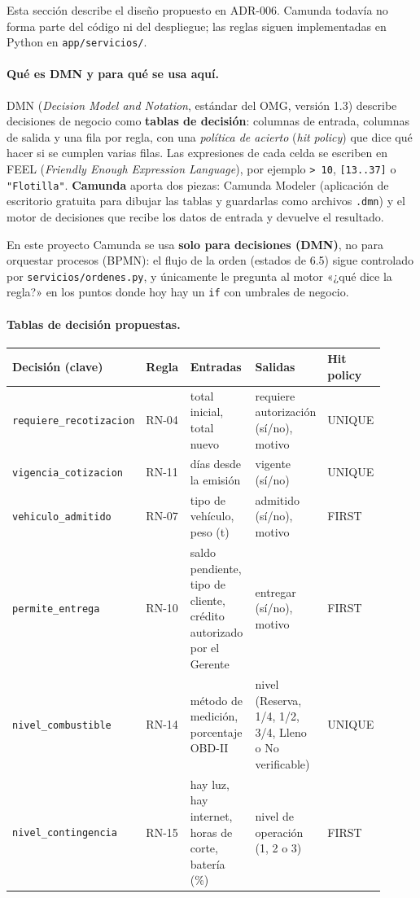 Esta sección describe el diseño propuesto en ADR-006. Camunda todavía no forma parte del
código ni del despliegue; las reglas siguen implementadas en Python en \texttt{app/servicios/}.

\paragraph{Qué es DMN y para qué se usa aquí.} DMN (\emph{Decision Model and Notation}, estándar del
OMG, versión 1.3) describe decisiones de negocio como \textbf{tablas de decisión}: columnas de entrada,
columnas de salida y una fila por regla, con una \emph{política de acierto} (\emph{hit policy}) que dice qué
hacer si se cumplen varias filas. Las expresiones de cada celda se escriben en FEEL (\emph{Friendly
Enough Expression Language}), por ejemplo \texttt{> 10}, \texttt{[13..37]} o
\texttt{"Flotilla"}. \textbf{Camunda} aporta dos piezas: Camunda Modeler (aplicación de escritorio
gratuita para dibujar las tablas y guardarlas como archivos \texttt{.dmn}) y el motor de decisiones que
recibe los datos de entrada y devuelve el resultado.

En este proyecto Camunda se usa \textbf{solo para decisiones (DMN)}, no para orquestar procesos (BPMN): el
flujo de la orden (estados de 6.5) sigue controlado por \texttt{servicios/ordenes.py}, y únicamente le
pregunta al motor «¿qué dice la regla?» en los puntos donde hoy hay un \texttt{if} con umbrales de negocio.

\paragraph{Tablas de decisión propuestas.}

{\small
\begin{longtable}{@{}L{0.2\linewidth}L{0.14\linewidth}L{0.22\linewidth}L{0.18\linewidth}L{0.17\linewidth}@{}}
\toprule
\textbf{Decisión (clave)} & \textbf{Regla} & \textbf{Entradas} & \textbf{Salidas} & \textbf{Hit policy} \\
\midrule
\endhead
\bottomrule
\endlastfoot
\texttt{requiere\_recotizacion} & RN-04 & total inicial, total nuevo & requiere autorización (sí/no),
motivo & UNIQUE \\
\texttt{vigencia\_cotizacion} & RN-11 & días desde la emisión & vigente (sí/no) & UNIQUE \\
\texttt{vehiculo\_admitido} & RN-07 & tipo de vehículo, peso (t) & admitido (sí/no), motivo & FIRST \\
\texttt{permite\_entrega} & RN-10 & saldo pendiente, tipo de cliente, crédito autorizado por el Gerente &
entregar (sí/no), motivo & FIRST \\
\texttt{nivel\_combustible} & RN-14 & método de medición, porcentaje OBD-II & nivel (Reserva, 1/4, 1/2,
3/4, Lleno o No verificable) & UNIQUE \\
\texttt{nivel\_contingencia} & RN-15 & hay luz, hay internet, horas de corte, batería (\%) & nivel de
operación (1, 2 o 3) & FIRST \\
\end{longtable}
}

